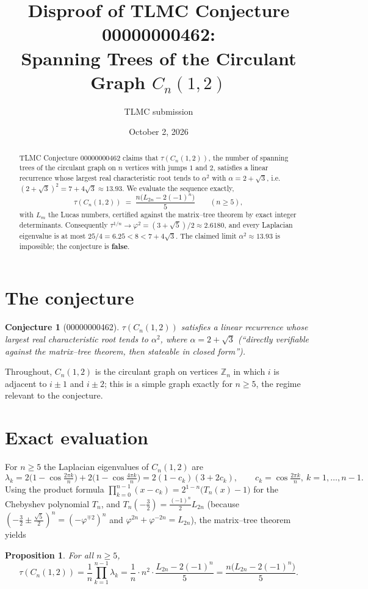 \documentclass[11pt]{article}
\title{Disproof of TLMC Conjecture 00000000462:\\
Spanning Trees of the Circulant Graph $C_n(1,2)$}
\author{TLMC submission}
\date{October 2, 2026}
\newtheorem{conj}{Conjecture}
\newtheorem{prop}{Proposition}
\theoremstyle{remark}
\begin{document}
\maketitle

\begin{abstract}
TLMC Conjecture 00000000462 claims that $\tau(C_n(1,2))$, the number of spanning
trees of the circulant graph on $n$ vertices with jumps $1$ and $2$, satisfies a
linear recurrence whose largest real characteristic root tends to
$\alpha^2$ with $\alpha = 2+\sqrt{3}$, i.e.\ $(2+\sqrt3)^2 = 7+4\sqrt3 \approx 13.93$.
We evaluate the sequence exactly,
\[
\tau(C_n(1,2)) \;=\; \frac{n\bigl(L_{2n} - 2(-1)^n\bigr)}{5} \qquad (n \ge 5),
\]
with $L_m$ the Lucas numbers, certified against the matrix--tree theorem by exact
integer determinants. Consequently $\tau^{1/n} \to \varphi^2 = (3+\sqrt5)/2 \approx
2.6180$, and every Laplacian eigenvalue is at most $25/4 = 6.25 < 8 < 7+4\sqrt3$.
The claimed limit $\alpha^2 \approx 13.93$ is impossible; the conjecture is \textbf{false}.
\end{abstract}

\section{The conjecture}

\begin{conj}[00000000462]
$\tau(C_n(1,2))$ satisfies a linear recurrence whose largest real characteristic
root tends to $\alpha^2$, where $\alpha = 2+\sqrt{3}$ (``directly verifiable
against the matrix--tree theorem, then stateable in closed form'').
\end{conj}

Throughout, $C_n(1,2)$ is the circulant graph on vertices $\mathbb{Z}_n$ in which
$i$ is adjacent to $i\pm1$ and $i\pm2$; this is a simple graph exactly for $n\ge5$,
the regime relevant to the conjecture.

\section{Exact evaluation}

For $n \ge 5$ the Laplacian eigenvalues of $C_n(1,2)$ are
\[
\lambda_k = 2\bigl(1-\cos\tfrac{2\pi k}{n}\bigr) + 2\bigl(1-\cos\tfrac{4\pi k}{n}\bigr)
= 2(1-c_k)(3+2c_k), \qquad c_k = \cos\tfrac{2\pi k}{n},\ k = 1,\dots,n-1 .
\]
Using the product formula $\prod_{k=0}^{n-1}(x - c_k) = 2^{1-n}\bigl(T_n(x)-1\bigr)$
for the Chebyshev polynomial $T_n$, and $T_n(-\tfrac32) = \tfrac{(-1)^n}{2}L_{2n}$
(because $(-\tfrac32 \pm \tfrac{\sqrt5}{2})^n = (-\varphi^{\mp 2})^n$ and
$\varphi^{2n} + \varphi^{-2n} = L_{2n}$), the matrix--tree theorem yields
\begin{prop}\label{prop:closed}
For all $n \ge 5$,
\[
\tau(C_n(1,2)) = \frac{1}{n}\prod_{k=1}^{n-1}\lambda_k
= \frac{1}{n}\cdot n^2 \cdot \frac{L_{2n} - 2(-1)^n}{5}
= \frac{n\bigl(L_{2n} - 2(-1)^n\bigr)}{5}.
\]
\end{prop}
\end{document}
